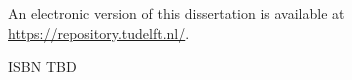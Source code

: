 \begin{titlepage}
\vspace{\bigskipamount}



\noindent
An electronic version of this dissertation is available at \\
\url{https://repository.tudelft.nl/}.

\medskip
\noindent
ISBN TBD

\end{titlepage}
